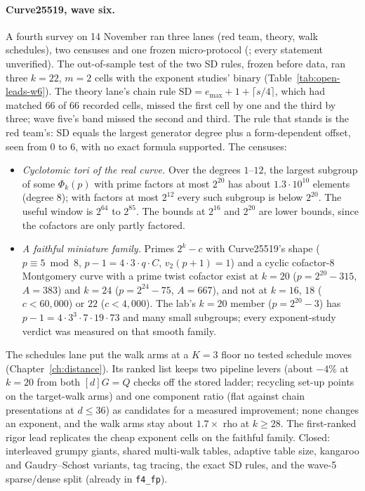 \paragraph{Curve25519, wave six.} A fourth survey on 14 November ran three
lanes (red team, theory, walk schedules), two censuses and one frozen
micro-protocol (;
every statement unverified). The out-of-sample test of the two SD rules,
frozen before data, ran three $k=22$, $m=2$ cells with the exponent
studies' binary (Table~\ref{tab:open-leads-w6}). The theory lane's chain
rule $\mathrm{SD}=e_{\max}+1+\lceil s/4\rceil$, which had matched 66 of 66
recorded cells, missed the first cell by one and the third by three; wave
five's band missed the second and third. The rule that stands is the red
team's: SD equals the largest generator degree plus a form-dependent
offset, seen from 0 to 6, with no exact formula supported. The censuses:
\begin{itemize}
\item \emph{Cyclotomic tori of the real curve.} Over the degrees
  $1$--$12$, the largest subgroup of some $\Phi_k(p)$ with prime factors at
  most $2^{20}$ has about $1.3\cdot10^{10}$ elements (degree 8); with
  factors at most $2^{12}$ every such subgroup is below $2^{20}$. The
  useful window is $2^{64}$ to $2^{85}$. The bounds at $2^{16}$ and $2^{20}$ are lower bounds, since the
  cofactors are only partly factored.
\item \emph{A faithful miniature family.} Primes $2^k-c$ with
  Curve25519's shape ($p\equiv5\bmod8$, $p-1=4\cdot3\cdot q\cdot C$,
  $v_2(p+1)=1$) and a cyclic cofactor-8 Montgomery curve with a prime twist
  cofactor exist at $k=20$ ($p=2^{20}-315$, $A=383$) and $k=24$
  ($p=2^{24}-75$, $A=667$), and not at $k=16$, $18$ ($c<60{,}000$) or $22$
  ($c<4{,}000$). The lab's $k=20$ member ($p=2^{20}-3$) has
  $p-1=4\cdot3^3\cdot7\cdot19\cdot73$ and many small subgroups; every
  exponent-study verdict was measured on that smooth family.
\end{itemize}
The schedules lane put the walk arms at a $K=3$ floor no tested schedule
moves (Chapter~\ref{ch:distance}). Its ranked list
keeps two pipeline levers (about $-4\%$ at $k=20$ from both $[d]G=Q$
checks off the stored ladder; recycling set-up points on the target-walk
arms) and one component ratio (flat against chain presentations at
$d\le36$) as candidates for a measured improvement; none changes an
exponent, and the walk arms stay about $1.7\times$ rho at $k\ge28$. The
first-ranked rigor lead replicates the cheap exponent cells on the faithful
family. Closed: interleaved grumpy giants, shared multi-walk tables,
adaptive table size, kangaroo and Gaudry--Schost variants, tag tracing, the
exact SD rules, and the wave-5 sparse/dense split (already in \texttt{f4\_fp}).

